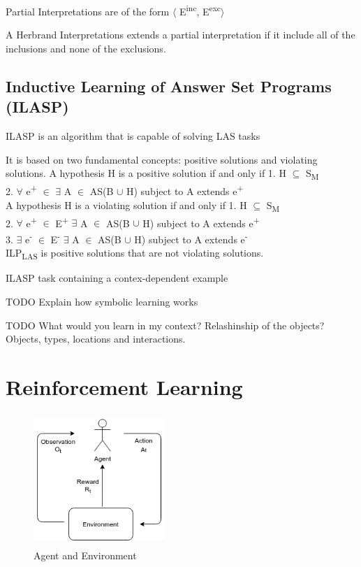 \documentclass[12pt,twoside]{report}
\begin{document}
Partial Interpretations are of the form $\langle$ E\textsuperscript{inc}, E\textsuperscript{exc}$\rangle$

A Herbrand Interpretations extends a partial interpretation if it include all of the inclusions and none of the exclusions.

\subsection{Inductive Learning of Answer Set Programs (ILASP)}

ILASP is an algorithm that is capable of solving LAS tasks

It is based on two fundamental concepts: positive solutions and violating solutions.
A hypothesis H is a positive solution if and only if
1. H $\subseteq$ S\textsubscript{M} \\
2. $\forall$ e\textsuperscript{+} $\in$ $\exists$ A $\in$ AS(B $\cup$ H) subject to A extends e\textsuperscript{+}\\

A hypothesis H is a violating solution if and only if
1. H $\subseteq$ S\textsubscript{M} \\
2. $\forall$ e\textsuperscript{+} $\in$ E\textsuperscript{+} $\exists$ A $\in$ AS(B $\cup$ H) subject to A extends e\textsuperscript{+}\\
3. $\exists$ e\textsuperscript{-} $\in$ E\textsuperscript{-} $\exists$ A $\in$ AS(B $\cup$ H) subject to A extends e\textsuperscript{-}\\


ILP\textsubscript{LAS} is positive solutions that are not violating solutions.

ILASP task containing a contex-dependent example

TODO Explain how symbolic learning works

TODO What would you learn in my context? Relashinship of the objects?
Objects, types, locations and interactions.

\section{Reinforcement Learning}
\label{rl}

\begin{figure}[!htb]
\centering
\includegraphics[width=5cm, height=5cm]{./figures/agent_env}
\caption{Agent and Environment}
\label{agent_env}
\end{figure}
\end{document}
